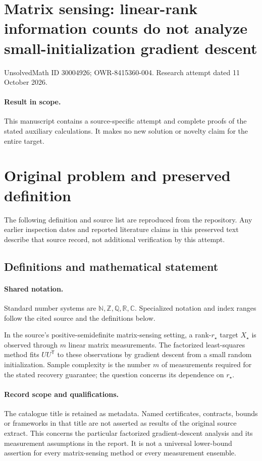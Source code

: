 \documentclass[11pt]{article}
\begin{document}
\section*{Matrix sensing: linear-rank information counts do not analyze small-initialization gradient descent}
\noindent UnsolvedMath ID 30004926; OWR-8415360-004. Research attempt dated 11 October 2026.
\paragraph{Result in scope.}This manuscript contains a source-specific attempt and complete proofs of the stated auxiliary calculations. It makes no new solution or novelty claim for the entire target.
\section{Original problem and preserved definition}
The following definition and source list are reproduced from the repository. Any earlier inspection dates and reported literature claims in this preserved text describe that source record, not additional verification by this attempt.
\subsection{Definitions and mathematical statement}

\paragraph{Shared notation.}Standard number systems are $\mathbb N,\mathbb Z,\mathbb Q,\mathbb R,\mathbb C$. Specialized notation and index ranges follow the cited source and the definitions below.


In the source's positive-semidefinite matrix-sensing setting, a rank-$r_\star$ target $X_\star$ is observed through $m$ linear matrix measurements. The factorized least-squares method fits $UU^{\mathsf T}$ to these observations by gradient descent from a small random initialization. Sample complexity is the number $m$ of measurements required for the stated recovery guarantee; the question concerns its dependence on $r_\star$.
\paragraph{Record scope and qualifications.}
The catalogue title is retained as metadata. Named certificates, contracts, bounds or frameworks in that title are not asserted as results of the original source extract.
This concerns the particular factorized gradient-descent analysis and its measurement assumptions in the report. It is not a universal lower-bound assertion for every matrix-sensing method or every measurement ensemble.
\end{document}

